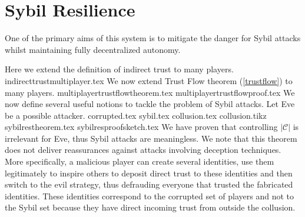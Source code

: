 \section{Sybil Resilience}
  One of the primary aims of this system is to mitigate the danger for Sybil attacks \cite{sybilattack} whilst maintaining
  fully decentralized autonomy.

  Here we extend the definition of indirect trust to many players.
  {indirecttrustmultiplayer.tex}
  We now extend Trust Flow theorem (\ref{trustflow}) to many players.
  {multiplayertrustflowtheorem.tex}
  {multiplayertrustflowproof.tex}
  We now define several useful notions to tackle the problem of Sybil attacks. Let Eve be a possible attacker.
  {corrupted.tex}
  {sybil.tex}
  {collusion.tex}
  {collusion.tikz}
  {sybilrestheorem.tex}
  {sybilresproofsketch.tex}
  We have proven that controlling $|\mathcal{C}|$ is irrelevant for Eve, thus Sybil attacks are meaningless. We note that
  this theorem does not deliver reassurances against attacks involving deception techniques. More specifically, a malicious
  player can create several identities, use them legitimately to inspire others to deposit direct trust to these identities
  and then switch to the evil strategy, thus defrauding everyone that trusted the fabricated identities. These identities
  correspond to the corrupted set of players and not to the Sybil set because they have direct incoming trust from outside
  the collusion.

